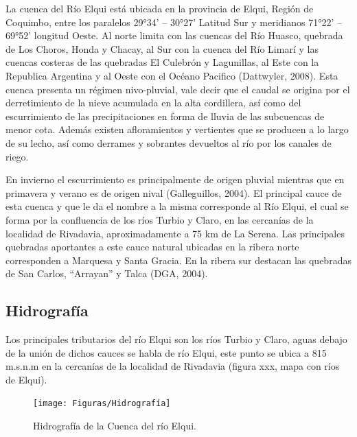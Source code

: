\documentclass[11pt,]{article}
\begin{document}
La cuenca del Río Elqui está ubicada en la provincia de Elqui, Región de Coquimbo, entre los paralelos 29°34’ – 30°27’ Latitud Sur y meridianos 71°22’ – 69°52’ longitud Oeste. Al norte limita con las cuencas del Río Huasco, quebrada de Los Choros, Honda y Chacay, al Sur con la cuenca del Río Limarí y las cuencas  costeras de las quebradas El Culebrón y Lagunillas, al Este con la Republica Argentina y al Oeste con el Océano Pacifico (Dattwyler, 2008).
Esta cuenca presenta un régimen nivo-pluvial, vale decir que el caudal se origina por el derretimiento de la nieve acumulada en la alta cordillera, así como del escurrimiento de las precipitaciones en forma de lluvia de las subcuencas de menor cota. Además existen afloramientos y vertientes que se producen a lo largo de su lecho, así como derrames y sobrantes devueltos al río por los canales de riego.\bigskip 

En invierno el escurrimiento es principalmente de origen pluvial  mientras que en primavera y verano es de origen nival (Galleguillos, 2004).
El principal cauce de esta cuenca y que le da el nombre a la misma corresponde al Río Elqui, el cual se forma por la confluencia de los ríos Turbio y Claro, en las cercanías de la localidad de Rivadavia, aproximadamente a 75 km de La Serena. Las principales quebradas aportantes a este cauce natural ubicadas en la ribera norte corresponden a Marquesa y Santa Gracia. En la ribera sur destacan las quebradas de San Carlos, “Arrayan” y Talca (DGA, 2004).


		\subsection{Hidrografía}\bigskip
		
		Los principales tributarios del río Elqui son los ríos Turbio y Claro, aguas debajo de la unión de dichos cauces se habla de río Elqui, este punto se ubica a 815 m.s.n.m en la cercanías de la localidad de 			 Rivadavia (figura xxx, mapa con ríos de Elqui).
		
\begin{figure}[H]
\begin{center}
\texttt{[image: Figuras/Hidrografía]}
\caption{Hidrografía de la Cuenca del río Elqui.}
\label{etiqueta_figura1}
\end{center}
\end{figure}
		
\end{document}
